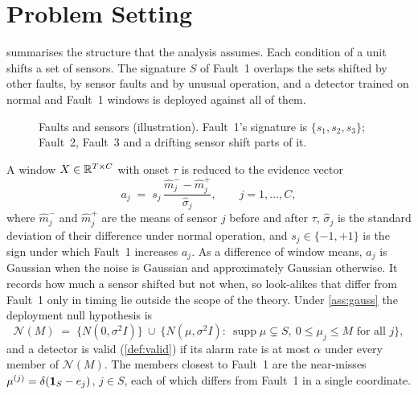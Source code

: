 \newpage
\section{Problem Setting}\label{app:setup}

 summarises the structure that the analysis assumes. Each condition of a unit shifts a set of sensors. The signature $S$ of Fault~1 overlaps the sets shifted by other faults, by sensor faults and by unusual operation, and a detector trained on normal and Fault~1 windows is deployed against all of them.

\begin{figure}[h]
  \centering
  
  \caption{Faults and sensors (illustration). Fault~1's signature is $\{s_1,s_2,s_3\}$; Fault~2, Fault~3 and a drifting sensor shift parts of it.}\label{fig:faults}
\end{figure}

A window $X\in\mathbb{R}^{T\times C}$ with onset $\tau$ is reduced to the evidence vector
\begin{equation}\label{eq:evidence}
  a_j \;=\; s_j\,\frac{\hat m_j^{-}-\hat m_j^{+}}{\hat\sigma_j},\qquad j=1,\dots,C,
\end{equation}
where $\hat m_j^{-}$ and $\hat m_j^{+}$ are the means of sensor $j$ before and after $\tau$, $\hat\sigma_j$ is the standard deviation of their difference under normal operation, and $s_j\in\{-1,+1\}$ is the sign under which Fault~1 increases $a_j$. As a difference of window means, $a_j$ is Gaussian when the noise is Gaussian and approximately Gaussian otherwise. It records how much a sensor shifted but not when, so look-alikes that differ from Fault~1 only in timing lie outside the scope of the theory. Under \cref{ass:gauss} the deployment null hypothesis is
\begin{equation}\label{eq:null}
  \mathcal N(M)\;=\;\big\{N(0,\sigma^2I)\big\}\ \cup\ \big\{N(\mu,\sigma^2I):\ \operatorname{supp}\mu\subsetneq S,\ 0\le\mu_j\le M\text{ for all }j\big\},
\end{equation}
and a detector is valid (\cref{def:valid}) if its alarm rate is at most $\alpha$ under every member of $\mathcal N(M)$. The members closest to Fault~1 are the near-misses $\mu^{(j)}=\delta(\mathbf{1}_S-e_j)$, $j\in S$, each of which differs from Fault~1 in a single coordinate.

